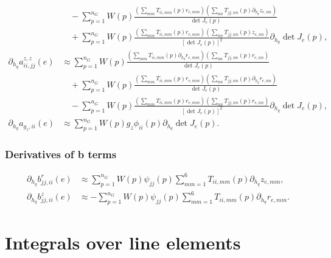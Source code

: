 \documentclass{article}
\begin{document}
\begin{align}
&\quad - \sum_{p=1}^{n_G} W(p) \frac{ \left( \sum_{mm} T_{ii,mm}(p) r_{e,mm} \right) \left( \sum_{nn} T_{jj,nn}(p) \partial_{h_q} z_{e,nn} \right) }{ \det J_e(p) } \nonumber\\
&\quad + \sum_{p=1}^{n_G} W(p) \frac{ \left( \sum_{mm} T_{ii,mm}(p) r_{e,mm} \right) \left( \sum_{nn} T_{jj,nn}(p) z_{e,nn} \right) }{ [\det J_e(p)]^2 } \partial_{h_q} \det J_e(p), \tag{20.73}\\
\partial_{h_q} a_{ii,jj}^{z,z}(e) &\approx \sum_{p=1}^{n_G} W(p) \frac{ \left( \sum_{mm} T_{ii,mm}(p) \partial_{h_q} r_{e,mm} \right) \left( \sum_{nn} T_{jj,nn}(p) r_{e,nn} \right) }{ \det J_e(p) } \nonumber\\
&\quad + \sum_{p=1}^{n_G} W(p) \frac{ \left( \sum_{mm} T_{ii,mm}(p) r_{e,mm} \right) \left( \sum_{nn} T_{jj,nn}(p) \partial_{h_q} r_{e,nn} \right) }{ \det J_e(p) } \nonumber\\
&\quad - \sum_{p=1}^{n_G} W(p) \frac{ \left( \sum_{mm} T_{ii,mm}(p) r_{e,mm} \right) \left( \sum_{nn} T_{jj,nn}(p) r_{e,nn} \right) }{ [\det J_e(p)]^2 } \partial_{h_q} \det J_e(p), \tag{20.76}\\
\partial_{h_q} a_{g_z,ii}(e) &\approx \sum_{p=1}^{n_G} W(p) g_z \phi_{ii}(p) \partial_{h_q} \det J_e(p). \tag{20.79}
\end{align}

\subsubsection{Derivatives of b terms}
\begin{align}
\partial_{h_q} b_{jj,ii}^{r}(e) &\approx \sum_{p=1}^{n_G} W(p) \psi_{jj}(p) \sum_{mm=1}^6 T_{ii,mm}(p) \partial_{h_q} z_{e,mm}, \tag{20.82}\\
\partial_{h_q} b_{jj,ii}^{z}(e) &\approx -\sum_{p=1}^{n_G} W(p) \psi_{jj}(p) \sum_{mm=1}^6 T_{ii,mm}(p) \partial_{h_q} r_{e,mm}. \tag{20.85}
\end{align}

\section{Integrals over line elements}
\end{document}
